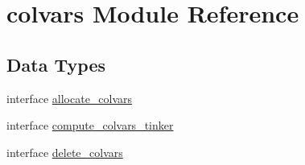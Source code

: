 \hypertarget{classcolvars}{\section{colvars Module Reference}
\label{classcolvars}
}
\subsection*{Data Types}
\begin{DoxyCompactItemize}
\item 
interface \hyperlink{interfacecolvars_1_1allocate__colvars}{allocate\-\_\-colvars}
\item 
interface \hyperlink{interfacecolvars_1_1compute__colvars__tinker}{compute\-\_\-colvars\-\_\-tinker}
\item 
interface \hyperlink{interfacecolvars_1_1delete__colvars}{delete\-\_\-colvars}
\end{DoxyCompactItemize}
